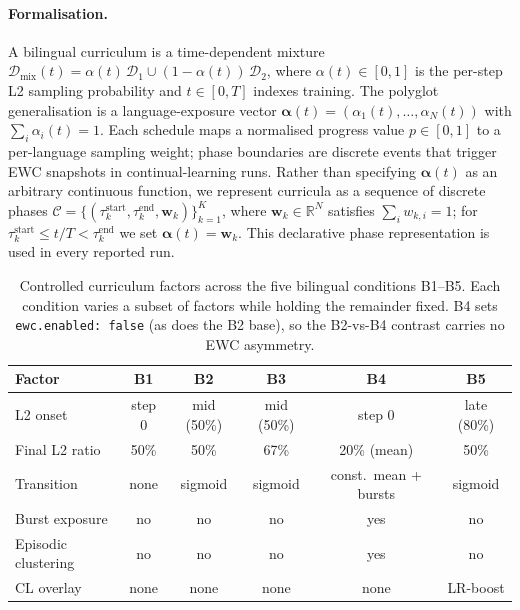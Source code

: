 \paragraph{Formalisation.} A bilingual curriculum is a time-dependent mixture $\mathcal{D}_{\text{mix}}(t) = \alpha(t)\,\mathcal{D}_1 \cup (1-\alpha(t))\,\mathcal{D}_2$, where $\alpha(t)\in[0,1]$ is the per-step L2 sampling probability and $t\in[0,T]$ indexes training. The polyglot generalisation is a language-exposure vector $\boldsymbol{\alpha}(t)=(\alpha_1(t),\ldots,\alpha_N(t))$ with $\sum_i \alpha_i(t)=1$. Each schedule maps a normalised progress value $p\in[0,1]$ to a per-language sampling weight; phase boundaries are discrete events that trigger EWC snapshots in continual-learning runs. Rather than specifying $\boldsymbol{\alpha}(t)$ as an arbitrary continuous function, we represent curricula as a sequence of discrete phases $\mathcal{C} = \{(\tau_k^{\text{start}}, \tau_k^{\text{end}}, \mathbf{w}_k)\}_{k=1}^{K}$, where $\mathbf{w}_k \in \mathbb{R}^N$ satisfies $\sum_i w_{k,i}=1$; for $\tau_k^{\text{start}} \le t/T < \tau_k^{\text{end}}$ we set $\boldsymbol{\alpha}(t) = \mathbf{w}_k$. This declarative phase representation is used in every reported run.
 
\begin{table}[t]
\centering
\small
\begin{tabular}{lccccc}
\toprule
\textbf{Factor} & \textbf{B1} & \textbf{B2} & \textbf{B3} & \textbf{B4} & \textbf{B5} \\
\midrule
L2 onset & step 0 & mid (50\%) & mid (50\%) & step 0 & late (80\%) \\
Final L2 ratio & 50\% & 50\% & 67\% & 20\% (mean) & 50\% \\
Transition & none & sigmoid & sigmoid & const.\ mean + bursts & sigmoid \\
Burst exposure & no & no & no & yes & no \\
Episodic clustering & no & no & no & yes & no \\
CL overlay & none & none & none & none & LR-boost \\
\bottomrule
\end{tabular}
\caption{Controlled curriculum factors across the five bilingual conditions B1--B5. Each condition varies a subset of factors while holding the remainder fixed. B4 sets \texttt{ewc.enabled: false} (as does the B2 base), so the B2-vs-B4 contrast carries no EWC asymmetry.}
\label{tab:taxonomy}
\end{table}
 
